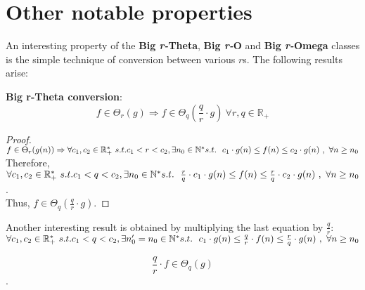  
\section{Other notable properties}
An interesting property of the \textbf{Big \textit{r-}Theta},  \textbf{Big \textit{r-}O} and \textbf{Big \textit{r-}Omega} classes is the simple technique of conversion between various $r$s. The following results arise:

\begin{theorem} \item \textbf{Big r-Theta conversion}: 
 \[  f \in \Theta_{r}(g) \Rightarrow f \in \Theta_{q} \left( \frac{q}{r} \cdot g \right) \ \forall r,q \in \mathbb{R}_{+}\]
\end{theorem} 

\begin{proof} 
$ f \in \Theta_{r}(g(n)) \Rightarrow \forall c_{1}, c_{2} \in \mathbb{R}^{*}_{+} \ s.t.  c_{1}< r < c_{2} , \exists n_{0} \in \mathbb{N}^{*}\ \\ s.t.\ \ c_{1} \cdot g(n) \leq f(n) \leq c_{2} \cdot g(n)\ ,\  \forall n \geq n_{0} $ \\
Therefore, $\forall c_{1}, c_{2} \in \mathbb{R}^{*}_{+} \ s.t.  c_{1} < q < c_{2} , \exists n_{0} \in \mathbb{N}^{*}\ \\ s.t.\ \ \frac{r}{q} \cdot c_{1} \cdot g(n) \leq f(n) \leq \frac{r}{q} \cdot c_{2} \cdot g(n)\ ,\  \forall n \geq n_{0}$. \\
Thus, $f \in \Theta_{q} \left( \frac{q}{r} \cdot g \right)$.
\end{proof} 

Another interesting result is obtained by multiplying the last equation by $\frac{q}{r}$: \\
$\forall c_{1}, c_{2} \in \mathbb{R}^{*}_{+} \ s.t.  c_{1} < q < c_{2} , \exists n_{0}' = n_{0} \in \mathbb{N}^{*}\ \\ s.t.\ \ c_{1} \cdot g(n) \leq \frac{q}{r} \cdot f(n) \leq \frac{r}{q} \cdot g(n)\ ,\  \forall n \geq n_{0}$ 
\begin{corollary} 
\[ \frac{q}{r} \cdot f \in \Theta_{q} \left( g \right)\].
\end{corollary} 




